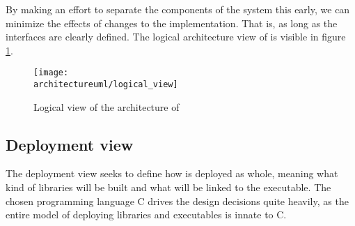 By making an effort to separate the components of the system this early, we can
minimize the effects of changes to the implementation. That is, as long as the
interfaces are clearly defined. The logical architecture view of \pman is
visible in figure \ref{dia:logical_view}.

\begin{figure}[H]
    \centering
    \centerline{\texttt{[image: \\architectureuml/logical\_view]}}
    \caption{Logical view of the architecture of \pman}
    \label{dia:logical_view}
\end{figure}

\subsection{Deployment view}

The deployment view seeks to define how \pman is deployed as whole, meaning
what kind of libraries will be built and what will be linked to the executable.
The chosen programming language C drives the design decisions quite heavily,
as the entire model of deploying libraries and executables is innate to C.
